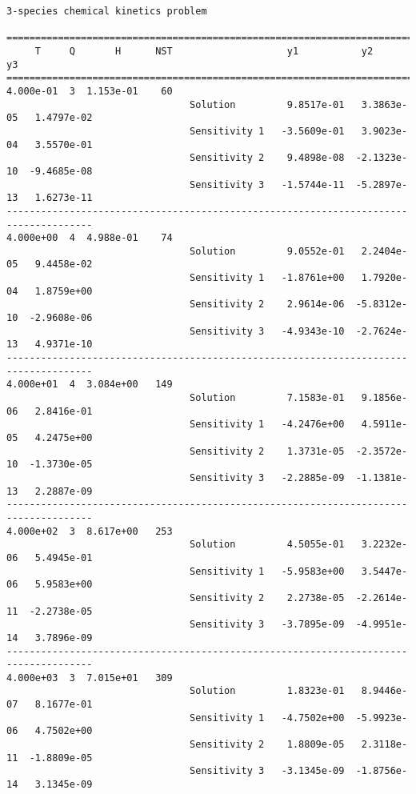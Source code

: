 \begin{verbatim}
3-species chemical kinetics problem

=====================================================================================
     T     Q       H      NST                    y1           y2           y3    
=====================================================================================
4.000e-01  3  1.153e-01    60
                                Solution         9.8517e-01   3.3863e-05   1.4797e-02 
                                Sensitivity 1   -3.5609e-01   3.9023e-04   3.5570e-01 
                                Sensitivity 2    9.4898e-08  -2.1323e-10  -9.4685e-08 
                                Sensitivity 3   -1.5744e-11  -5.2897e-13   1.6273e-11 
-------------------------------------------------------------------------------------
4.000e+00  4  4.988e-01    74
                                Solution         9.0552e-01   2.2404e-05   9.4458e-02 
                                Sensitivity 1   -1.8761e+00   1.7920e-04   1.8759e+00 
                                Sensitivity 2    2.9614e-06  -5.8312e-10  -2.9608e-06 
                                Sensitivity 3   -4.9343e-10  -2.7624e-13   4.9371e-10 
-------------------------------------------------------------------------------------
4.000e+01  4  3.084e+00   149
                                Solution         7.1583e-01   9.1856e-06   2.8416e-01 
                                Sensitivity 1   -4.2476e+00   4.5911e-05   4.2475e+00 
                                Sensitivity 2    1.3731e-05  -2.3572e-10  -1.3730e-05 
                                Sensitivity 3   -2.2885e-09  -1.1381e-13   2.2887e-09 
-------------------------------------------------------------------------------------
4.000e+02  3  8.617e+00   253
                                Solution         4.5055e-01   3.2232e-06   5.4945e-01 
                                Sensitivity 1   -5.9583e+00   3.5447e-06   5.9583e+00 
                                Sensitivity 2    2.2738e-05  -2.2614e-11  -2.2738e-05 
                                Sensitivity 3   -3.7895e-09  -4.9951e-14   3.7896e-09 
-------------------------------------------------------------------------------------
4.000e+03  3  7.015e+01   309
                                Solution         1.8323e-01   8.9446e-07   8.1677e-01 
                                Sensitivity 1   -4.7502e+00  -5.9923e-06   4.7502e+00 
                                Sensitivity 2    1.8809e-05   2.3118e-11  -1.8809e-05 
                                Sensitivity 3   -3.1345e-09  -1.8756e-14   3.1345e-09 

\end{verbatim}
